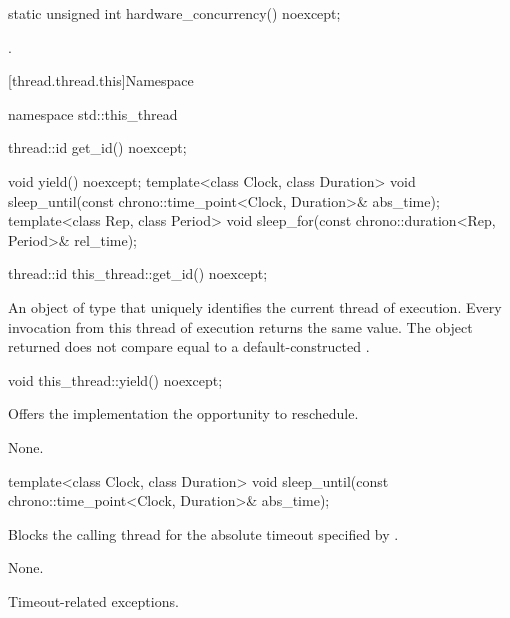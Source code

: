 %
\begin{itemdecl}
static unsigned int hardware_concurrency() noexcept;
\end{itemdecl}

\begin{itemdescr}
\pnum
\returns
{}.
\end{itemdescr}


[thread.thread.this]{Namespace }

\begin{codeblock}
namespace std::this_thread {
  thread::id get_id() noexcept;

  void yield() noexcept;
  template<class Clock, class Duration>
    void sleep_until(const chrono::time_point<Clock, Duration>& abs_time);
  template<class Rep, class Period>
    void sleep_for(const chrono::duration<Rep, Period>& rel_time);
}
\end{codeblock}

%
\begin{itemdecl}
thread::id this_thread::get_id() noexcept;
\end{itemdecl}

\begin{itemdescr}
\pnum
\returns
An object of type 
that uniquely identifies the current thread of execution.
Every invocation from this thread of execution returns the same value.
The object returned does not compare equal to
a default-constructed .
\end{itemdescr}

%
\begin{itemdecl}
void this_thread::yield() noexcept;
\end{itemdecl}

\begin{itemdescr}
\pnum
\effects
Offers the implementation the opportunity to reschedule.

\pnum
\sync
None.
\end{itemdescr}

%
\begin{itemdecl}
template<class Clock, class Duration>
  void sleep_until(const chrono::time_point<Clock, Duration>& abs_time);
\end{itemdecl}

\begin{itemdescr}
\pnum
{}%
\effects
Blocks the calling thread for the absolute timeout specified
by .

\pnum
\sync
None.

\pnum
\throws
Timeout-related exceptions.
\end{itemdescr}

